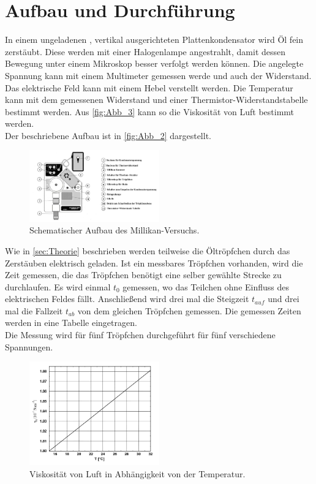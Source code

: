 \section{Aufbau und Durchführung}
\label{sec:Durchführung}
In einem ungeladenen , vertikal ausgerichteten Plattenkondensator wird Öl fein
zerstäubt. Diese werden mit einer Halogenlampe angestrahlt, damit dessen Bewegung
unter einem Mikroskop besser verfolgt werden können. Die angelegte Spannung kann mit
einem Multimeter gemessen werde und auch der Widerstand. Das elektrische Feld kann 
mit einem Hebel verstellt werden. Die Temperatur kann mit dem gemessenen Widerstand 
und einer Thermistor-Widerstandstabelle bestimmt werden. Aus \autoref{fig:Abb_3} kann so die Viskosität von Luft bestimmt werden.\\
Der beschriebene Aufbau ist in \autoref{fig:Abb_2} dargestellt.
\begin{figure}[H]
    \centering
    \includegraphics[width=0.5\textwidth]{Abbildungen/Abb_2.png}
    \caption {Schematischer Aufbau des Millikan-Versuchs\cite[3]{V503}.}
    \label{fig:Abb_2}
\end{figure}
Wie in \autoref{sec:Theorie} beschrieben werden teilweise die Öltröpfchen durch das Zerstäuben 
elektrisch geladen. Ist ein messbares Tröpfchen vorhanden, wird die Zeit gemessen, die 
das Tröpfchen benötigt eine selber gewählte Strecke zu durchlaufen.
Es wird einmal $t_0$ gemessen, wo das Teilchen ohne Einfluss des elektrischen Feldes fällt.
Anschließend wird drei mal die Steigzeit $t_{auf}$ und drei mal die Fallzeit $t_{ab}$ von 
dem gleichen Tröpfchen gemessen. Die gemessen Zeiten werden in eine Tabelle eingetragen.\\
Die Messung wird für fünf Tröpfchen durchgeführt für fünf verschiedene Spannungen.
\begin{figure}[H]
    \centering
    \includegraphics[width=0.5\textwidth]{Abbildungen/Abb_3.png}
    \caption {Viskosität von Luft in Abhängigkeit von der Temperatur\cite[5]{V503}.}
    \label{fig:Abb_3}
\end{figure}